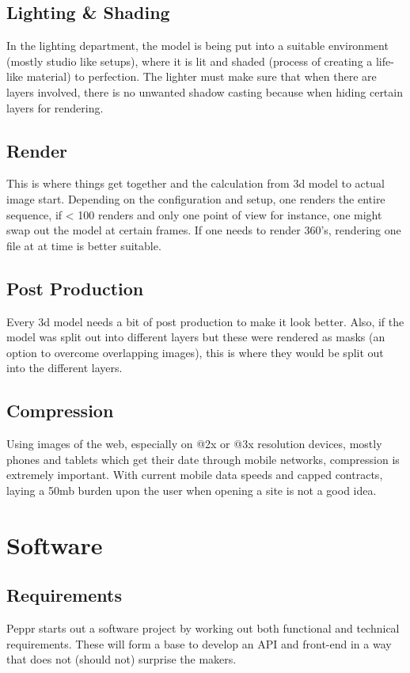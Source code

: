 \subsection{Lighting \& Shading}
In the lighting department, the model is being put into a suitable environment (mostly studio like setups), where it is lit and shaded (process of creating a life-like material) to perfection. The lighter must make sure that when there are layers involved, there is no unwanted shadow casting because when hiding certain layers for rendering.
\subsection{Render}
This is where things get together and the calculation from 3d model to actual image start. Depending on the configuration and setup, one renders the entire sequence, if < 100 renders and only one point of view for instance, one might swap out the model at certain frames. If one needs to render 360's, rendering one file at at time is better suitable.
\subsection{Post Production}
Every 3d model needs a bit of post production to make it look better. Also, if the model was split out into different layers but these were rendered as masks (an option to overcome overlapping images), this is where they would be split out into the different layers.
\subsection{Compression}
Using images of the web, especially on @2x or @3x resolution devices, mostly phones and tablets which get their date through mobile networks, compression is extremely important. With current mobile data speeds and capped contracts, laying a 50mb burden upon the user when opening a site is not a good idea.

\section{Software}
\subsection{Requirements}
Peppr starts out a software project by working out both functional and technical requirements. These will form a base to develop an API and front-end in a way that does not (should not) surprise the makers.
